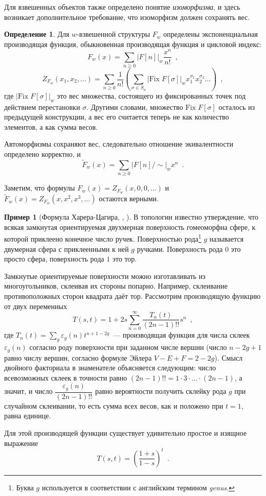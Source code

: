 \documentclass[a5paper]{article}
\theoremstyle{definition}
\newtheorem{example}{Пример}
\newtheorem*{definition}{Определение}
\begin{document}
Для взвешенных объектов также определено понятие \textit{изоморфизма}, и здесь
возникает дополнительное требование, что изоморфизм должен сохранять вес.

\begin{definition}
    Для \(w\)-взвешенной структуры \( F_w \) определены экспоненциальная
производящая функция, обыкновенная производящая функция и цикловой индекс:
\[
    F_w(x) = \sum_{n \geq 0} |F[n]|_w \dfrac{x^n}{n!} \enspace ,
\]
\[
    Z_{F_w} (x_1, x_2, \ldots) = \sum_{n \geq 0} \dfrac{1}{n!} \left(
        \sum_{\sigma \in S_n} |\mathrm{Fix}\; F[\sigma]|_w x_1^{\sigma_1}
x_2^{\sigma_2} \ldots
    \right)
    \enspace ,
\]
где \( |\mathrm{Fix}\; F[\sigma]|_w \) это вес множества, состоящего из
фиксированных точек под действием перестановки \( \sigma \). Другими словами,
множество \( \mathrm{Fix}\; F[\sigma] \) осталось из предыдущей конструкции, а
вес его считается теперь не как количество элементов, а как сумма весов.

Автоморфизмы сохраняют вес, следовательно отношение экивалентности определено
корректно, и 
\[
     \widetilde F_w (x) = \sum_{n \geq 0} |F[n] / \sim |_w x^n \enspace .
\]
\end{definition}

Заметим, что формулы \( F_w(x) = Z_{F_w} (x, 0, 0, \ldots) \) и \( \widetilde
F_{w} (x) = Z_{F_w} (x, x^2, x^3, \ldots) \) остаются верными. 

\begin{example}[Формула Харера-Цагира, \cite{lando}, \cite{pittel}]
\label{example:harer-zagier}
    В топологии известно утверждение, что всякая замкнутая ориентируемая
двухмерная поверхность гомеоморфна сфере, к которой приклеено конечное число
ручек. Поверхностью рода\footnote{Буква \( g \) используется в соответствии с
английским термином \textit{genus}.} \( g \) называется 
двумерная сфера с приклеенными к ней \( g \) ручками. Поверхность рода \( 0 \)
это просто сфера, поверхность рода \( 1 \) это тор. 

Замкнутые ориентируемые поверхности можно изготавливать из многоугольников,
склеивая их стороны попарно. Например, склеивание противоположных сторон
квадрата даёт тор. Рассмотрим производящую функцию от двух переменных
\[
    T(s, t) = 1 + 2 s \sum_{n = 0}^\infty \dfrac{T_n(t)}{(2n-1)!!} s^n \enspace
, 
\]
где \( T_n(t) = \sum_{g} \varepsilon_g(n) t^{n+1-2g} \)~--- производящая функция
для числа склеек \( \varepsilon_g(n) \) согласно роду поверхности при заданном
числе вершин (число \( n - 2g + 1 \) равно числу вершин, согласно формуле Эйлера
\( V-E+F = 2 - 2g \)).
Смысл двойного факториала в знаменателе объясняется следующим: число
всевозможных склеек в точности равно \( (2n-1)!! = 1 \cdot 3 \cdot \ldots \cdot
(2n-1) \), а значит, и число \( \dfrac{\varepsilon_g(n)}{(2n-1)!!} \) равно
вероятности получить склейку рода \( g \) при случайном склеивании, то есть
сумма всех весов, как и положено при \( t = 1 \), равна единице. 

Для этой производящей функции существует удивительно простое и изящное выражение 
\[
    T(s, t) = \left(
        \dfrac{1+s}{1-s}
    \right)^t \enspace .
\]
\end{example}
\end{document}
